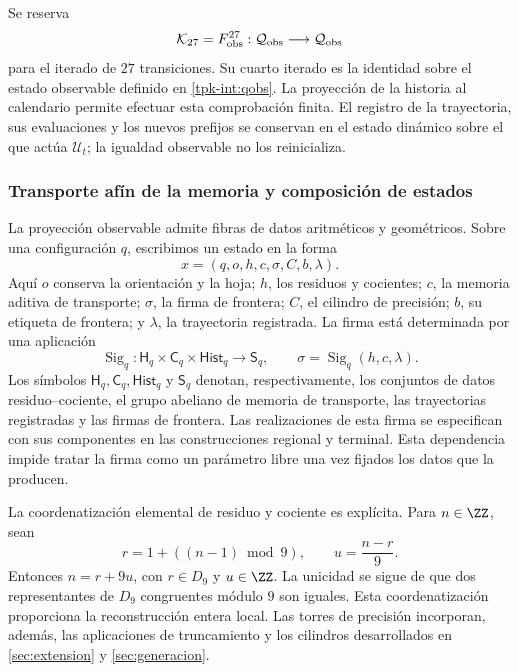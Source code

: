 Se reserva
\[
 \mathcal K_{27}=F_{\rm obs}^{27}:
 \mathcal Q_{\rm obs}\longrightarrow\mathcal Q_{\rm obs}
\]
para el iterado de \(27\) transiciones. Su cuarto iterado es la
identidad sobre el estado observable definido en \eqref{tpk-int:qobs}.
La proyección de la historia al calendario permite efectuar esta
comprobación finita. El registro de la trayectoria, sus evaluaciones y
los nuevos prefijos se conservan en el estado dinámico sobre el que
actúa \(\mathcal U_t\); la igualdad observable no los reinicializa.

\subsubsection{Transporte afín de la memoria y composición de estados}
\label{tpk-int:memoria}

La proyección observable admite fibras de datos aritméticos y geométricos.
Sobre una configuración \(q\), escribimos un estado en la forma
\[
 x=(q,o,h,c,\sigma,C,b,\lambda).
\]
Aquí \(o\) conserva la orientación y la hoja; \(h\), los residuos
y cocientes; \(c\), la memoria aditiva de transporte; \(\sigma\),
la firma de frontera; \(C\), el cilindro de precisión; \(b\), su
etiqueta de frontera; y \(\lambda\), la trayectoria registrada. La
firma está determinada por una aplicación
\[
 \operatorname{Sig}_q:
 \mathsf H_q\times\mathsf C_q\times\mathsf{Hist}_q
 \longrightarrow\mathsf S_q,
 \qquad \sigma=\operatorname{Sig}_q(h,c,\lambda).
\]
Los símbolos \(\mathsf H_q,\mathsf C_q,\mathsf{Hist}_q\) y
\(\mathsf S_q\) denotan, respectivamente, los conjuntos de datos
residuo--cociente, el grupo abeliano de memoria de transporte, las
trayectorias registradas y las firmas de frontera.
Las realizaciones de esta firma se especifican con sus componentes en
las construcciones regional y terminal. Esta dependencia impide tratar
la firma como un parámetro libre una vez fijados los datos que la producen.

La coordenatización elemental de residuo y cociente es explícita. Para
\(n\in\ZZ\), sean
\[
 r=1+((n-1)\bmod9),\qquad u=\frac{n-r}{9}.
\]
Entonces \(n=r+9u\), con \(r\in D_9\) y \(u\in\ZZ\).
La unicidad se sigue de que dos representantes de \(D_9\) congruentes
módulo \(9\) son iguales. Esta coordenatización proporciona la reconstrucción
entera local. Las torres de precisión incorporan, además, las aplicaciones
de truncamiento y los cilindros desarrollados en
\ref{sec:extension} y \ref{sec:generacion}.

